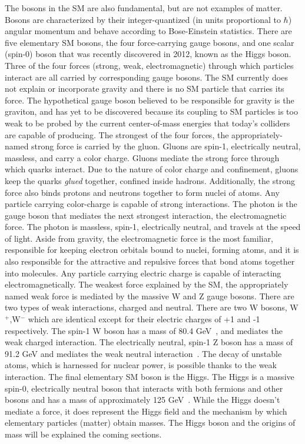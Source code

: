 The bosons in the SM are also fundamental, but are not examples of matter. Bosons are characterized by their integer-quantized (in units proportional to $\hbar$) angular momentum and behave according to Bose-Einstein statistics. There are five elementary SM bosons, the four force-carrying gauge
bosons, and one scalar (spin-0) boson that was recently discovered in 2012, known as the Higgs boson. Three of the four forces (strong, weak, electromagnetic) through which particles interact are all
carried by corresponding gauge bosons. The SM currently does not explain or incorporate gravity and there is no SM particle that carries its force. The hypothetical gauge boson believed to be responsible for gravity is the graviton,
and has yet to be discovered because its coupling to SM particles is too weak to be probed by the current center-of-mass energies that today's colliders are capable of producing.
The strongest of the four forces, the appropriately-named strong force is carried by the gluon. Gluons are spin-1, electrically neutral, massless, and carry a color charge. Gluons mediate the strong force through which quarks interact. Due to the nature of
color charge and confinement, gluons keep the quarks \emph{glued} together, confined inside hadrons. Additionally, the strong force also binds protons and neutrons together to form nuclei of atoms. Any particle carrying color-charge
is capable of strong interactions. 
The photon is the gauge boson that mediates the next strongest interaction, the electromagnetic force. The photon is massless, spin-1, electrically neutral, and travels at the speed of light. Aside from gravity, the electromagnetic force is the most familiar,
responsible for keeping electron orbitals bound to nuclei, forming atoms, and it is also responsible for the attractive and repulsive forces that bond atoms together into molecules. Any particle carrying electric charge is capable of interacting electromagnetically.
The weakest force explained by the SM, the appropriately named weak force is mediated by the massive W and Z gauge bosons. There are two types of weak interactions, charged and neutral.
There are two W bosons, W$^+$,W$^-$ which are identical except for their electric charges of +1 and -1 respectively. The spin-1 W boson has a mass of 80.4 GeV~\cite{pdg}, and mediates the weak charged interaction.
The electrically neutral, spin-1 Z boson has a mass of 91.2 GeV and mediates the weak neutral interaction~\cite{pdg}. The decay of unstable atoms, which is harnessed for nuclear power, is possible thanks to the weak interaction.
The final elementary SM boson is the Higgs. The Higgs is a massive spin-0, electrically neutral boson that interacts with both fermions and other bosons and has a mass of approximately 125 GeV~\cite{pdg}. While the Higgs doesn't mediate a force,
it does represent the Higgs field and the
mechanism by which elementary particles (matter) obtain masses. The Higgs boson and the origins of mass will be explained the coming sections. 

